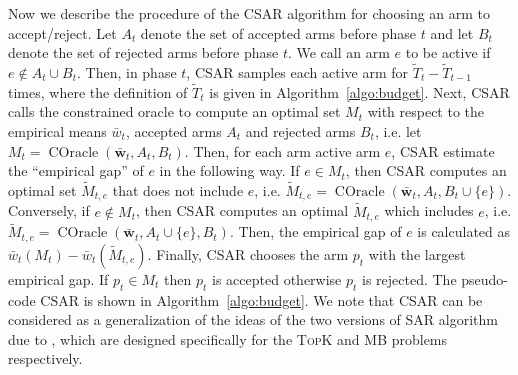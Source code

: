 \documentclass{article}
\newcommand{\AlgorithmBud}{{\small \textsf{CSAR}}\xspace}
\DeclareMathOperator{\COracle}{COracle}
\newcommand{\MultiIdent}{\textsc{TopK}\xspace}
\newcommand{\MultiBandit}{\textsc{MB}\xspace}
\renewcommand{\vec}[1]{\boldsymbol{#1}}
\begin{document}
Now we describe the procedure of the \AlgorithmBud algorithm for choosing an arm to accept/reject.
Let $A_t$ denote the set of accepted arms before phase $t$ and let $B_t$ denote the set of rejected arms before phase $t$.
We call an arm $e$ to be active if $e\not\in A_t\cup B_t$.
Then, in phase $t$, \AlgorithmBud samples each active arm for $\tilde T_t -\tilde T_{t-1}$ times, where the definition of $\tilde T_t$ is given in Algorithm~\ref{algo:budget}.
Next, \AlgorithmBud calls the constrained oracle to compute an optimal set $M_t$ with respect to the empirical means $\bar w_t$, accepted arms $A_t$ and rejected arms $B_t$, i.e. let $M_t = \COracle(\vec {\bar w}_t, A_t,B_t)$.
Then, for each arm active arm $e$, \AlgorithmBud estimate the ``empirical gap'' of $e$ in the following way.
If $e\in M_t$, then \AlgorithmBud computes an optimal set $\tilde M_{t,e}$ that does not include $e$, i.e. $\tilde M_{t,e} = \COracle(\vec {\bar w}_t, A_t, B_t \cup \{e\})$.
Conversely, if $e\not\in M_t$, then \AlgorithmBud computes an optimal $\tilde M_{t,e}$ which includes $e$, i.e. $\tilde M_{t,e} = \COracle(\vec {\bar w}_t, A_t \cup \{e\}, B_t)$.
Then, the empirical gap of $e$ is calculated as $\bar w_t(M_t)-\bar w_t(\tilde M_{t,e})$.
Finally, \AlgorithmBud chooses the  arm $p_t$ with the largest empirical gap.
If $p_t\in M_t$ then $p_t$ is accepted otherwise $p_t$ is rejected.
The pseudo-code \AlgorithmBud is shown in Algorithm~\ref{algo:budget}.
We note that \AlgorithmBud can be considered as a generalization of the ideas of the two versions of SAR algorithm due to \citet{bubeck2013multiple}, which are designed specifically for the \MultiIdent and \MultiBandit problems respectively.
\end{document}
